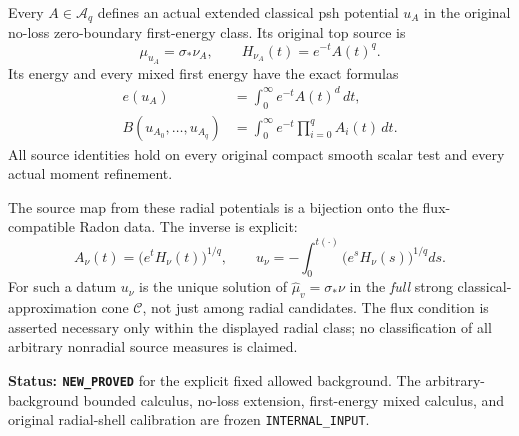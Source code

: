 \begin{theorem}
\label{thm:r12-exact-radial-flux-inverse}
Every $A\in\mathscr A_q$ defines an actual extended
classical psh potential $u_A$ in the original no-loss
zero-boundary first-energy class.  Its original top source is
\[
 \mu_{u_A}=\sigma_*\nu_A,\qquad
 H_{\nu_A}(t)=e^{-t}A(t)^q.
 \tag{RF5}
\]
Its energy and every mixed first energy have the exact formulas
\[
 \begin{split}
 e(u_A)&=\int_0^\infty e^{-t}A(t)^d\,dt,\\
 B(u_{A_0},\ldots,u_{A_q})
     &=\int_0^\infty e^{-t}\prod_{i=0}^q A_i(t)\,dt.
 \end{split}
 \tag{RF6}
\]
All source identities hold on every original compact smooth
scalar test and every actual moment refinement.

The source map from these radial potentials is a bijection
onto the flux-compatible Radon data.  The inverse is explicit:
\[
 A_\nu(t)=\bigl(e^tH_\nu(t)\bigr)^{1/q},\qquad
 u_\nu=-\int_0^{t(\cdot)}
                     \bigl(e^sH_\nu(s)\bigr)^{1/q}ds.
 \tag{RF7}
\]
For such a datum $u_\nu$ is the unique solution of
$\widehat\mu_v=\sigma_*\nu$ in the \emph{full} strong
classical-approximation cone $\mathscr C$, not just among
radial candidates.  The flux condition is asserted necessary
only within the displayed radial class; no classification of
all arbitrary nonradial source measures is claimed.
\end{theorem}

\noindent\textbf{Status: \texttt{NEW\_PROVED}} for the
explicit fixed allowed background.  The arbitrary-background
bounded calculus, no-loss extension, first-energy mixed
calculus, and original radial-shell calibration are frozen
\texttt{INTERNAL\_INPUT}.

